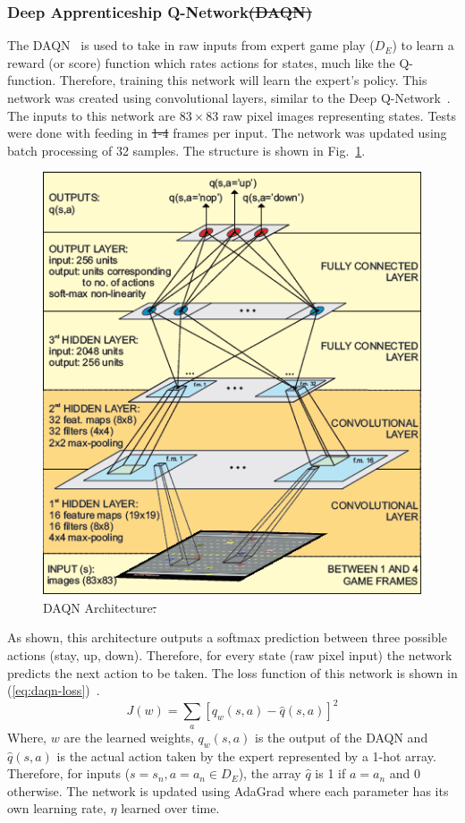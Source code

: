 \documentclass[12pt,american]{report}
\providecommand{\DIFaddtex}[1]{{\protect\color{blue}\uwave{#1}}} %
\providecommand{\DIFdeltex}[1]{{\protect\color{red}\sout{#1}}}                      %
\providecommand{\DIFaddbegin}{} %
\providecommand{\DIFaddend}{} %
\providecommand{\DIFdelbegin}{} %
\providecommand{\DIFdelend}{} %
\providecommand{\DIFaddFL}[1]{\DIFadd{#1}} %
\providecommand{\DIFdelFL}[1]{\DIFdel{#1}} %
\providecommand{\DIFaddbeginFL}{} %
\providecommand{\DIFaddendFL}{} %
\providecommand{\DIFdelbeginFL}{} %
\providecommand{\DIFdelendFL}{} %
\providecommand{\DIFadd}[1]{\texorpdfstring{\DIFaddtex{#1}}{#1}} %
\providecommand{\DIFdel}[1]{\texorpdfstring{\DIFdeltex{#1}}{}} %
\newcommand{\DIFscaledelfig}{0.5}
\newlength{\DIFdelgraphicswidth} %
\newlength{\DIFdelgraphicsheight} %
\newcommand{\DIFaddincludegraphics}[2][]{{\color{blue}\fbox{\DIFOincludegraphics[#1]{#2}}}} %
\newcommand{\DIFdelincludegraphics}[2][]{%
\sbox{\DIFdelgraphicsbox}{\DIFOincludegraphics[#1]{#2}}%
\settoboxwidth{\DIFdelgraphicswidth}{\DIFdelgraphicsbox} %
\settoboxtotalheight{\DIFdelgraphicsheight}{\DIFdelgraphicsbox} %
\scalebox{\DIFscaledelfig}{%
\parbox[b]{\DIFdelgraphicswidth}{\usebox{\DIFdelgraphicsbox}\\[-\baselineskip] \rule{\DIFdelgraphicswidth}{0em}}\llap{\resizebox{\DIFdelgraphicswidth}{\DIFdelgraphicsheight}{%
\setlength{\unitlength}{\DIFdelgraphicswidth}%
\begin{picture}(1,1)%
\thicklines\linethickness{2pt} %
{\color[rgb]{1,0,0}\put(0,0){\framebox(1,1){}}}%
{\color[rgb]{1,0,0}\put(0,0){\line( 1,1){1}}}%
{\color[rgb]{1,0,0}\put(0,1){\line(1,-1){1}}}%
\end{picture}%
}\hspace*{3pt}}} %
} %
\DeclareRobustCommand{\DIFaddbegin}{\DIFOaddbegin \let\includegraphics\DIFaddincludegraphics} %
\DeclareRobustCommand{\DIFaddend}{\DIFOaddend \let\includegraphics\DIFOincludegraphics} %
\DeclareRobustCommand{\DIFdelbegin}{\DIFOdelbegin \let\includegraphics\DIFdelincludegraphics} %
\DeclareRobustCommand{\DIFdelend}{\DIFOaddend \let\includegraphics\DIFOincludegraphics} %
\DeclareRobustCommand{\DIFaddbeginFL}{\DIFOaddbeginFL \let\includegraphics\DIFaddincludegraphics} %
\DeclareRobustCommand{\DIFaddendFL}{\DIFOaddendFL \let\includegraphics\DIFOincludegraphics} %
\DeclareRobustCommand{\DIFdelbeginFL}{\DIFOdelbeginFL \let\includegraphics\DIFdelincludegraphics} %
\DeclareRobustCommand{\DIFdelendFL}{\DIFOaddendFL \let\includegraphics\DIFOincludegraphics} %
\begin{document}
\subsubsection{Deep Apprenticeship Q-Network\DIFdelbegin \DIFdel{(DAQN)}\DIFdelend }
The DAQN~\cite{markovikj2014deep} is used to take in raw inputs from expert game play ($D_E$) to learn a reward (or score) function which rates actions for states, much like the Q-function. Therefore, training this network will learn the expert's policy. This network was created using convolutional layers, similar to the Deep Q-Network~\cite{atari}. The inputs to this network are $83\times 83$ raw pixel images representing states.  Tests were done with feeding in \DIFdelbegin \DIFdel{1-4 }\DIFdelend \DIFaddbegin \DIFadd{one-four }\DIFaddend frames per input. The network was updated using batch processing of 32 samples. The structure is shown in Fig.~\ref{fig:daqn-dal}.
\begin{figure}
\centering
\includegraphics[scale=1.5]{images/daqn-dal.png}
\caption{DAQN Architecture\DIFdelbeginFL \DIFdelFL{.}\DIFdelendFL ~\cite{markovikj2014deep}\DIFaddbeginFL \DIFaddFL{.}\DIFaddendFL }
\label{fig:daqn-dal}
\end{figure}
As shown, this architecture outputs a softmax prediction between three possible actions (stay, up, down).  Therefore, for every state (raw pixel input) the network predicts the next action to be taken. The loss function of this network is shown in (\ref{eq:daqn-loss})~\cite{markovikj2014deep}.
\begin{equation}
     \label{eq:daqn-loss}
     J(w) =\sum_{a}[q_w(s,a)-\hat{q}(s,a)]^2%
\end{equation}
Where, $w$ are the learned weights, $q_w(s,a)$ is the output of the DAQN and $\hat{q}(s,a)$ is the actual action taken by the expert represented by a 1-hot array.  Therefore, for inputs ($s=s_n,a=a_n \in D_E$), the array $\hat{q}$ is 1 if $a = a_n$ and 0 otherwise. The network is updated using AdaGrad where each parameter has its own learning rate, $\eta$ learned over time.
\end{document}
